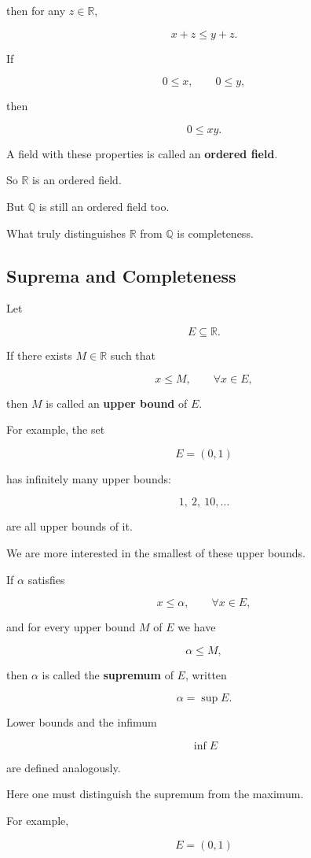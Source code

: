 \documentclass[11pt]{article}
\begin{document}
then for any $z\in\mathbb{R}$,

\[
x+z\leq y+z.
\]

If

\[
0\leq x,\qquad0\leq y,
\]

then

\[
0\leq xy.
\]

A field with these properties is called an \textbf{ordered field}.

So $\mathbb{R}$ is an ordered field.

But $\mathbb{Q}$ is still an ordered field too.

What truly distinguishes $\mathbb{R}$ from $\mathbb{Q}$ is completeness.

\subsection{Suprema and Completeness}

Let

\[
E\subseteq\mathbb{R}.
\]

If there exists $M\in\mathbb{R}$ such that

\[
x\leq M,\qquad\forall x\in E,
\]

then $M$ is called an \textbf{upper bound} of $E$.

For example, the set

\[
E=(0,1)
\]

has infinitely many upper bounds:

\[
1,\ 2,\ 10,\ldots
\]

are all upper bounds of it.

We are more interested in the smallest of these upper bounds.

If $\alpha$ satisfies

\[
x\leq\alpha,\qquad\forall x\in E,
\]

and for every upper bound $M$ of $E$ we have

\[
\alpha\leq M,
\]

then $\alpha$ is called the \textbf{supremum} of $E$, written

\[
\alpha=\sup E.
\]

Lower bounds and the infimum

\[
\inf E
\]

are defined analogously.

Here one must distinguish the supremum from the maximum.

For example,

\[
E=(0,1)
\]
\end{document}
